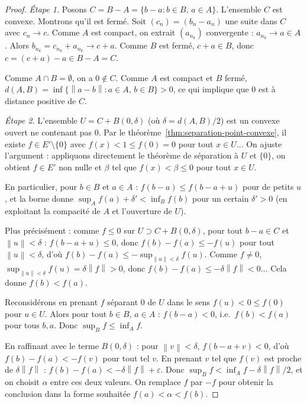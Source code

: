 \documentclass[a4paper,12pt]{book}
\newcommand{\norm}[1]{\left\| #1 \right\|}
\theoremstyle{definition}
\theoremstyle{plain}
\theoremstyle{remark}
\begin{document}
\begin{proof}
\emph{Étape 1.} Posons $C = B - A = \{b - a : b \in B,\, a \in A\}$.
L'ensemble $C$ est convexe. Montrons qu'il est fermé. Soit $(c_n) = (b_n - a_n)$ une
suite dans $C$ avec $c_n \to c$. Comme $A$ est compact, on extrait $(a_{n_k})$
convergente : $a_{n_k} \to a \in A$. Alors $b_{n_k} = c_{n_k} + a_{n_k} \to c + a$.
Comme $B$ est fermé, $c + a \in B$, donc $c = (c+a) - a \in B - A = C$.

Comme $A \cap B = \emptyset$, on a $0 \notin C$. Comme $A$ est compact et $B$ fermé,
$d(A, B) = \inf\{\norm{a-b} : a \in A,\, b \in B\} > 0$, ce qui implique que $0$
est à distance positive de $C$.

\emph{Étape 2.} L'ensemble $U = C + B(0, \delta)$ (où $\delta = d(A,B)/2$) est un
convexe ouvert ne contenant pas $0$. Par le
théorème~\ref{thm:separation-point-convexe}, il existe $f \in E' \setminus \{0\}$ avec
$f(x) < 1 \leq f(0) = 0$ pour tout $x \in U$... On ajuste l'argument :
appliquons directement le théorème de séparation à $U$ et $\{0\}$, on obtient
$f \in E'$ non nulle et $\beta$ tel que $f(x) < \beta \leq 0$ pour tout $x \in U$.

En particulier, pour $b \in B$ et $a \in A$ : $f(b-a) \leq f(b-a+u)$ pour de petits $u$,
et la borne donne $\sup_A f(a) + \delta' < \inf_B f(b)$ pour un certain $\delta' > 0$
(en exploitant la compacité de $A$ et l'ouverture de $U$).

Plus précisément : comme $f \leq 0$ sur $U \supset C + B(0,\delta)$, pour tout
$b - a \in C$ et $\norm{u} < \delta$ : $f(b-a+u) \leq 0$, donc
$f(b) - f(a) \leq -f(u)$ pour tout $\norm{u} < \delta$, d'où
$f(b) - f(a) \leq -\sup_{\norm{u}<\delta} f(u)$.
Comme $f \neq 0$, $\sup_{\norm{u}<\delta} f(u) = \delta\norm{f} > 0$, donc
$f(b) - f(a) \leq -\delta\norm{f} < 0$... Cela donne $f(b) < f(a)$.

Reconsidérons en prenant $f$ séparant $0$ de $U$ dans le sens $f(u) < 0 \leq f(0)$
pour $u \in U$. Alors pour tout $b \in B$, $a \in A$ : $f(b - a) < 0$, i.e.\
$f(b) < f(a)$ pour tous $b, a$. Donc $\sup_B f \leq \inf_A f$.

En raffinant avec le terme $B(0,\delta)$ : pour $\norm{v} < \delta$,
$f(b-a+v) < 0$, d'où $f(b) - f(a) < -f(v)$ pour tout tel $v$. En prenant $v$ tel
que $f(v)$ est proche de $\delta\norm{f}$ : $f(b) - f(a) < -\delta\norm{f} + \varepsilon$.
Donc $\sup_B f < \inf_A f - \delta\norm{f}/2$, et on choisit $\alpha$ entre ces deux
valeurs. On remplace $f$ par $-f$ pour obtenir la conclusion dans la forme souhaitée
$f(a) < \alpha < f(b)$.
\end{proof}
\end{document}
